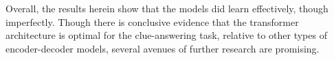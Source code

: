 \documentclass[letterpaper]{article} %
\begin{document}
\begin{NoHyper}
Overall, the results herein show that the models did learn effectively, though imperfectly.
Though there is conclusive evidence that the transformer architecture is optimal for the clue-answering task,
relative to other types of encoder-decoder models, several avenues of further research are promising.



\end{NoHyper}
\end{document}
